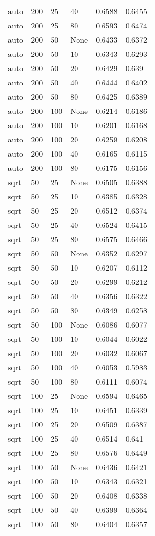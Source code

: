 \documentclass{article}%
\begin{document}
\begin{longtable}{l l l l l l}
auto&200&25&40&0.6588&0.6455\\%
auto&200&25&80&0.6593&0.6474\\%
auto&200&50&None&0.6433&0.6372\\%
auto&200&50&10&0.6343&0.6293\\%
auto&200&50&20&0.6429&0.639\\%
auto&200&50&40&0.6444&0.6402\\%
auto&200&50&80&0.6425&0.6389\\%
auto&200&100&None&0.6214&0.6186\\%
auto&200&100&10&0.6201&0.6168\\%
auto&200&100&20&0.6259&0.6208\\%
auto&200&100&40&0.6165&0.6115\\%
auto&200&100&80&0.6175&0.6156\\%
sqrt&50&25&None&0.6505&0.6388\\%
sqrt&50&25&10&0.6385&0.6328\\%
sqrt&50&25&20&0.6512&0.6374\\%
sqrt&50&25&40&0.6524&0.6415\\%
sqrt&50&25&80&0.6575&0.6466\\%
sqrt&50&50&None&0.6352&0.6297\\%
sqrt&50&50&10&0.6207&0.6112\\%
sqrt&50&50&20&0.6299&0.6212\\%
sqrt&50&50&40&0.6356&0.6322\\%
sqrt&50&50&80&0.6349&0.6258\\%
sqrt&50&100&None&0.6086&0.6077\\%
sqrt&50&100&10&0.6044&0.6022\\%
sqrt&50&100&20&0.6032&0.6067\\%
sqrt&50&100&40&0.6053&0.5983\\%
sqrt&50&100&80&0.6111&0.6074\\%
sqrt&100&25&None&0.6594&0.6465\\%
sqrt&100&25&10&0.6451&0.6339\\%
sqrt&100&25&20&0.6509&0.6387\\%
sqrt&100&25&40&0.6514&0.641\\%
sqrt&100&25&80&0.6576&0.6449\\%
sqrt&100&50&None&0.6436&0.6421\\%
sqrt&100&50&10&0.6343&0.6321\\%
sqrt&100&50&20&0.6408&0.6338\\%
sqrt&100&50&40&0.6399&0.6364\\%
sqrt&100&50&80&0.6404&0.6357\\%

\end{longtable}
\end{document}
